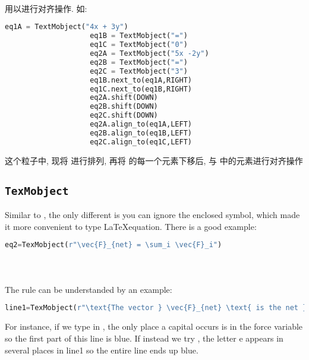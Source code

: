         \paragraph{ \\}
            \hspace*{2em}用以进行对齐操作. 如:
                \begin{lstlisting}[language = {Python}, gobble = 20]
                    eq1A = TextMobject("4x + 3y")
                    eq1B = TextMobject("=")
                    eq1C = TextMobject("0")
                    eq2A = TextMobject("5x -2y")
                    eq2B = TextMobject("=")
                    eq2C = TextMobject("3")
                    eq1B.next_to(eq1A,RIGHT)
                    eq1C.next_to(eq1B,RIGHT)
                    eq2A.shift(DOWN)
                    eq2B.shift(DOWN)
                    eq2C.shift(DOWN)
                    eq2A.align_to(eq1A,LEFT)
                    eq2B.align_to(eq1B,LEFT)
                    eq2C.align_to(eq1C,LEFT)
                \end{lstlisting}
            这个粒子中, 现将  进行排列, 再将  的每一个元素下移后, 与  中的元素进行对齐操作

    \subsection{\texttt{TexMobject}}
        \hspace*{2em}Similar to , the only different is you can ignore the enclosed \Code{\$} symbol, which made it more convenient to type \LaTeX equation. There is a good example:
            \begin{lstlisting}[language = {Python}, gobble = 16]
                eq2=TexMobject(r"\vec{F}_{net} = \sum_i \vec{F}_i")
            \end{lstlisting}

        \paragraph{ \\}
            \hspace*{2em}The rule can be understanded by an example:
                \begin{lstlisting}[language = {Python}, gobble = 20]
                    line1=TexMobject(r"\text{The vector } \vec{F}_{net} \text{ is the net }",r"\text{force }",r"\text{on object of mass }")
                \end{lstlisting}
            For instance, if we type in , the only place a capital  occurs is in the force variable so the first part of this line is blue. If instead we try , the letter e appears in several places in line1 so the entire line ends up blue.

